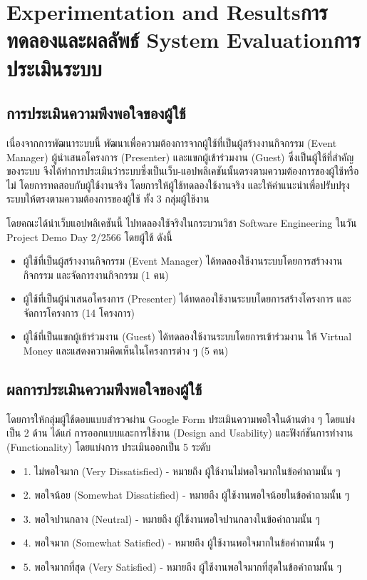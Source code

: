 \chapter{\ifproject%
      \ifenglish Experimentation and Results\else การทดลองและผลลัพธ์\fi
  \else%
      \ifenglish System Evaluation\else การประเมินระบบ\fi
  \fi}

\section{การประเมินความพึงพอใจของผู้ใช้}
เนื่องจากการพัฒนาระบบนี้ พัฒนาเพื่อความต้องการจากผู้ใช้ที่เป็นผู้สร้างงานกิจกรรม (Event Manager) ผู้นำเสนอโครงการ (Presenter) และแขกผู้เข้าร่วมงาน (Guest) ซึ่งเป็นผู้ใช้ที่สำคัญของระบบ จึงได้ทำการประเมินว่าระบบซึ่งเป็นเว็บ-แอปพลิเคชันนั้นตรงตามความต้องการของผู้ใช้หรือไม่ โดยการทดสอบกับผู้ใช้งานจริง โดยการให้ผู้ใช้ทดลองใช้งานจริง และให้คำแนะนำเพื่อปรับปรุงระบบให้ตรงตามความต้องการของผู้ใช้
ทั้ง 3 กลุ่มผู้ใช้งาน


โดยคณะได้นำเว็บแอปพลิเคชันนี้ ไปทดลองใช้จริงในกระบวนวิชา Software Engineering ในวัน Project Demo Day 2/2566 โดยผู้ใช้ ดังนี้
\begin{itemize}
    \item ผู้ใช้ที่เป็นผู้สร้างงานกิจกรรม (Event Manager) ได้ทดลองใช้งานระบบโดยการสร้างงานกิจกรรม และจัดการงานกิจกรรม (1 คน)
    \item ผู้ใช้ที่เป็นผู้นำเสนอโครงการ (Presenter) ได้ทดลองใช้งานระบบโดยการสร้างโครงการ และจัดการโครงการ (14 โครงการ)
    \item ผู้ใช้ที่เป็นแขกผู้เข้าร่วมงาน (Guest) ได้ทดลองใช้งานระบบโดยการเข้าร่วมงาน ให้ Virtual Money และแสดงความคิดเห็นในโครงการต่าง ๆ (5 คน)
\end{itemize}

\section{ผลการประเมินความพึงพอใจของผู้ใช้}
โดยการให้กลุ่มผู้ใช้ตอบแบบสำรวจผ่าน Google Form ประเมินความพอใจในด้านต่าง ๆ โดยแบ่งเป็น 2 ด้าน ได้แก่ การออกแบบและการใช้งาน (Design and Usability) และฟังก์ชันการทำงาน (Functionality)
โดยแบ่งการ ประเมินออกเป็น 5 ระดับ
\begin{itemize}
    \item 1. ไม่พอใจมาก (Very Dissatisfied) - หมายถึง ผู้ใช้งานไม่พอใจมากในข้อคำถามนั้น ๆ
    \item 2. พอใจน้อย (Somewhat Dissatisfied) - หมายถึง ผู้ใช้งานพอใจน้อยในข้อคำถามนั้น ๆ
    \item 3. พอใจปานกลาง (Neutral) - หมายถึง ผู้ใช้งานพอใจปานกลางในข้อคำถามนั้น ๆ
    \item 4. พอใจมาก (Somewhat Satisfied) - หมายถึง ผู้ใช้งานพอใจมากในข้อคำถามนั้น ๆ
    \item 5. พอใจมากที่สุด (Very Satisfied) - หมายถึง ผู้ใช้งานพอใจมากที่สุดในข้อคำถามนั้น ๆ
\end{itemize}

